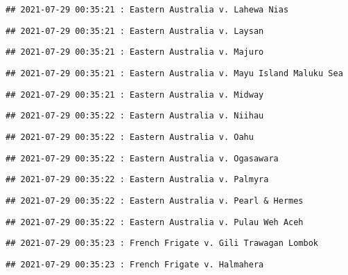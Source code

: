 \documentclass[
]{article}
\begin{document}
\begin{verbatim}
## 2021-07-29 00:35:21 : Eastern Australia v. Lahewa Nias
\end{verbatim}

\begin{verbatim}
## 2021-07-29 00:35:21 : Eastern Australia v. Laysan
\end{verbatim}

\begin{verbatim}
## 2021-07-29 00:35:21 : Eastern Australia v. Majuro
\end{verbatim}

\begin{verbatim}
## 2021-07-29 00:35:21 : Eastern Australia v. Mayu Island Maluku Sea
\end{verbatim}

\begin{verbatim}
## 2021-07-29 00:35:21 : Eastern Australia v. Midway
\end{verbatim}

\begin{verbatim}
## 2021-07-29 00:35:22 : Eastern Australia v. Niihau
\end{verbatim}

\begin{verbatim}
## 2021-07-29 00:35:22 : Eastern Australia v. Oahu
\end{verbatim}

\begin{verbatim}
## 2021-07-29 00:35:22 : Eastern Australia v. Ogasawara
\end{verbatim}

\begin{verbatim}
## 2021-07-29 00:35:22 : Eastern Australia v. Palmyra
\end{verbatim}

\begin{verbatim}
## 2021-07-29 00:35:22 : Eastern Australia v. Pearl & Hermes
\end{verbatim}

\begin{verbatim}
## 2021-07-29 00:35:22 : Eastern Australia v. Pulau Weh Aceh
\end{verbatim}

\begin{verbatim}
## 2021-07-29 00:35:23 : French Frigate v. Gili Trawagan Lombok
\end{verbatim}

\begin{verbatim}
## 2021-07-29 00:35:23 : French Frigate v. Halmahera
\end{verbatim}
\end{document}
